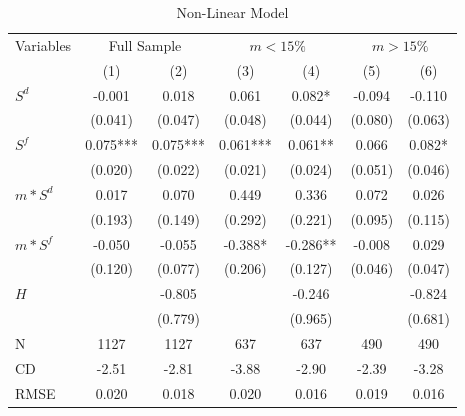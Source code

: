 \documentclass[12pt]{article}
\begin{document}
\begin{table}[h!]
    \centering
     \doublespacing
        \caption{Non-Linear Model}
        \setlength{\tabcolsep}{0.8pt} 
  \begin{tabular*}{\textwidth}{@{\extracolsep{\fill}}l*{6}{c}}
  \hline
    Variables & \multicolumn{2}{c}{Full Sample} & \multicolumn{2}{c}{$m<15\%$} & \multicolumn{2}{c}{$m>15\%$} \\
    \cmidrule(lr){2-7}
        & (1)  & (2) & (3) & (4) & (5) & (6)  \\
        \hline
        $S^d$ & -0.001 & 0.018 & 0.061 &0.082* & -0.094  & -0.110 \\
         & (0.041) &(0.047)  & (0.048) &(0.044) &(0.080)  & (0.063)\\
        $S^f$ & 0.075*** & 0.075*** & 0.061*** & 0.061** & 0.066 & 0.082* \\
         & (0.020) & (0.022) & (0.021) & (0.024) & (0.051) &(0.046) \\
        $m*S^d$ & 0.017 & 0.070  &0.449  &0.336  &0.072  &0.026 \\
         & (0.193) &(0.149)  &(0.292)  &(0.221)  &(0.095)  &(0.115) \\
        $m*S^f$ & -0.050 & -0.055 & -0.388* &-0.286**  &-0.008  &0.029 \\
         & (0.120) & (0.077) & (0.206) & (0.127) & (0.046) & (0.047) \\
         $H$&  &-0.805  &  & -0.246 &  &-0.824 \\
         & & (0.779) & & (0.965) & & (0.681) \\
         \hline
        N & 1127 & 1127 & 637 & 637 & 490 & 490 \\
        CD & -2.51 & -2.81 & -3.88 & -2.90 & -2.39 & -3.28\\
        RMSE & 0.020 & 0.018 & 0.020 & 0.016 & 0.019 &0.016 \\
        \hline
    \end{tabular*}
    \label{tab: nl}
\end{table}
\end{document}
